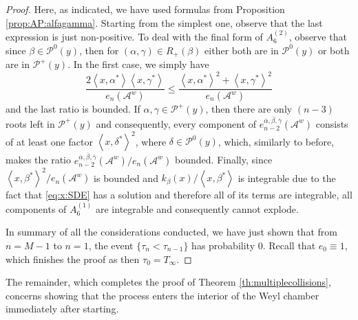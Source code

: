 \documentclass{article}
\numberwithin{equation}{section}
\newcommand{\Aa}{\mathcal{A}^{w}}
\newcommand{\xas}{\left<x,\alpha^*\right>}
\newcommand{\xbs}{\left<x,\beta^*\right>}
\newcommand{\xcs}{\left<x,\gamma^*\right>}
\newcommand{\xds}{\left<x,\delta^*\right>}
\newcommand{\eA}[1]{e_{#1}(\Aa)}
\newcommand{\eabcA}[1]{e_{#1}^{\overline{\alpha}, \overline{\beta}, \overline{\gamma}}(\Aa)}
\newcommand{\Pzero}{\mathcal{P}^0(y)}
\newcommand{\Pplus}{\mathcal{P}^+(y)}
\newcommand{\lifetime}{T_\infty}
\theoremstyle{plain}
\begin{document}
\begin{proof}
 Here, as indicated, we have used formulas from Proposition \ref{prop:AP:alfagamma}. Starting from the simplest one, observe that the last expression is just non-positive. To deal with the final form of $A_6^{(2)}$, observe that since $\beta\in\Pzero$, then for $(\alpha,\gamma)\in R_+(\beta)$ either both are in $\Pzero$ or both are in $\Pplus$. In the first case, we simply have 
 \begin{equation*}
    \frac{2\xas\xcs}{\eA{n}}   \leq \frac{\xas^2+\xcs^2}{\eA{n}} 
 \end{equation*}
and the last ratio is bounded. If $\alpha,\gamma\in \Pplus$, then there are only $(n-3)$ roots left in $\Pplus$ and consequently, every component of $\eabcA{n-2}$ consists of at least one factor $\xds^2$, where $\delta\in\Pzero$, which, similarly to before, makes the ratio $\eabcA{n-2}/\eA{n}$ bounded. Finally, since $\xbs^2/\eA{n}$ is bounded and $k_\beta(x)/\xbs$ is integrable {due to the fact that \eqref{eq:x:SDE} has a solution and therefore all of its terms are integrable,} all components of $A_6^{(1)}$ are integrable and consequently cannot explode.

\medskip

In summary of all the considerations conducted, we have just shown that from $n=M-1$ to $n=1$, the event $\{\tau_{n}<\tau_{n-1}\}$ has probability $0$. Recall that $e_0\equiv1$, which finishes the proof as then $\tau_0=\lifetime$. 
\end{proof}

The remainder, which completes the proof of Theorem \ref{th:multiplecollisions}, concerns showing that the process enters the interior of the Weyl chamber immediately after starting.
\end{document}
